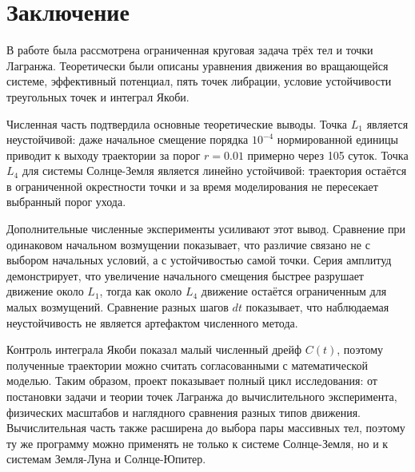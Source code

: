 \newpage
\section*{Заключение}

В работе была рассмотрена ограниченная круговая задача трёх тел и точки
Лагранжа. Теоретически были описаны уравнения движения
во вращающейся системе, эффективный потенциал, пять точек либрации, условие
устойчивости треугольных точек и интеграл Якоби.

Численная часть подтвердила основные теоретические выводы. Точка $L_1$
является неустойчивой: даже начальное смещение порядка $10^{-4}$ нормированной
единицы приводит к выходу траектории за порог $r=0.01$ примерно через
105 суток. Точка $L_4$ для системы Солнце-Земля является линейно устойчивой:
траектория остаётся в ограниченной окрестности точки и за время моделирования
не пересекает выбранный порог ухода.

Дополнительные численные эксперименты усиливают этот вывод. Сравнение при
одинаковом начальном возмущении показывает, что различие связано не с выбором
начальных условий, а с устойчивостью самой точки. Серия амплитуд демонстрирует,
что увеличение начального смещения быстрее разрушает движение около $L_1$,
тогда как около $L_4$ движение остаётся ограниченным для малых возмущений.
Сравнение разных шагов $dt$ показывает, что наблюдаемая неустойчивость не
является артефактом численного метода.

Контроль интеграла Якоби показал малый численный дрейф $C(t)$, поэтому
полученные траектории можно считать согласованными с математической моделью.
Таким образом, проект показывает полный цикл исследования: от постановки
задачи и теории точек Лагранжа до вычислительного эксперимента, физических
масштабов и наглядного сравнения разных типов движения. Вычислительная часть
также расширена до выбора пары массивных тел, поэтому ту же программу можно
применять не только к системе Солнце-Земля, но и к системам Земля-Луна и
Солнце-Юпитер.
